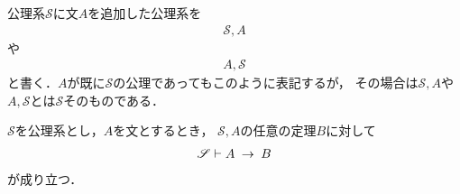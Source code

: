 	公理系$\mathscr{S}$に文$A$を追加した公理系を
	\begin{align}
		\mathscr{S}, A
	\end{align}
	や
	\begin{align}
		A, \mathscr{S}
	\end{align}
	と書く．$A$が既に$\mathscr{S}$の公理であってもこのように表記するが，
	その場合は$\mathscr{S}, A$や$A,\mathscr{S}$とは$\mathscr{S}$そのものである．
	
	\begin{screen}
		\begin{metathm}[演繹法則]
			$\mathscr{S}$を公理系とし，$A$を文とするとき，
			$\mathscr{S}, A$の任意の定理$B$に対して
			\begin{align}
				\mathscr{S} \vdash A \hspace{0.25em}\rightarrow\hspace{0.25em} B
			\end{align}
			が成り立つ．
		\end{metathm}
	\end{screen}
	

